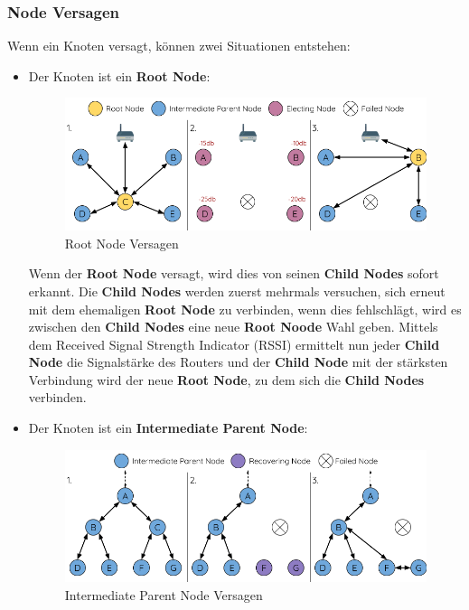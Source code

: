\subsubsection{Node Versagen}
Wenn ein Knoten versagt, können zwei Situationen entstehen:
\begin{itemize}
    \item Der Knoten ist ein \textbf{Root Node}:
    
    \begin{figure}[H] \begin{center}
        \includegraphics[scale=0.5]{diagrams/mesh-root-node-failure.png}
        \caption{Root Node Versagen\cite{esp-mesh}}
        \end{center}    
    \end{figure}

    Wenn der \textbf{Root Node} versagt, wird dies von seinen \textbf{Child Nodes} sofort erkannt. Die \textbf{Child Nodes} werden zuerst mehrmals versuchen, sich erneut mit dem ehemaligen \textbf{Root Node} zu verbinden, wenn dies fehlschlägt, wird es zwischen den \textbf{Child Nodes} eine neue \textbf{Root Noode} Wahl geben. Mittels dem Received Signal Strength Indicator (RSSI) ermittelt nun jeder \textbf{Child Node} die Signalstärke des Routers und der \textbf{Child Node} mit der stärksten Verbindung wird der neue \textbf{Root Node}, zu dem sich die \textbf{Child Nodes} verbinden.

    \item Der Knoten ist ein \textbf{Intermediate Parent Node}:
    
    \begin{figure}[H] \begin{center}
        \includegraphics[scale=0.5]{diagrams/mesh-parent-node-failure.png}
        \caption{Intermediate Parent Node Versagen\cite{esp-mesh}}
        \end{center}    
    \end{figure}


\end{itemize}
